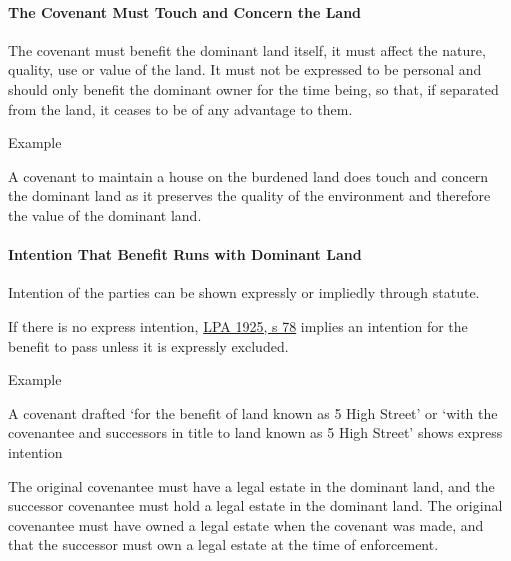 \documentclass[
]{article}
\newenvironment{env-de3101d4-f08b-48eb-bc0e-2fa06f3bcf8e}
{
    \savenotes\tcolorbox[blanker,breakable,left=5pt,borderline west={2pt}{-4pt}{purple}]
}
{
    \endtcolorbox\spewnotes
}
\begin{document}
\hypertarget{the-covenant-must-touch-and-concern-the-land}{%
\paragraph{The Covenant Must Touch and Concern the
Land}\label{the-covenant-must-touch-and-concern-the-land}}

The covenant must benefit the dominant land itself, it must affect the
nature, quality, use or value of the land. It must not be expressed to
be personal and should only benefit the dominant owner for the time
being, so that, if separated from the land, it ceases to be of any
advantage to them.

\begin{env-de3101d4-f08b-48eb-bc0e-2fa06f3bcf8e}

Example

A covenant to maintain a house on the burdened land does touch and
concern the dominant land as it preserves the quality of the environment
and therefore the value of the dominant land.

\end{env-de3101d4-f08b-48eb-bc0e-2fa06f3bcf8e}

\hypertarget{intention-that-benefit-runs-with-dominant-land}{%
\paragraph{Intention That Benefit Runs with Dominant
Land}\label{intention-that-benefit-runs-with-dominant-land}}

Intention of the parties can be shown expressly or impliedly through
statute.

If there is no express intention,
\href{https://www.legislation.gov.uk/ukpga/Geo5/15-16/20/section/78}{LPA
1925, s 78} implies an intention for the benefit to pass unless it is
expressly excluded.

\begin{env-de3101d4-f08b-48eb-bc0e-2fa06f3bcf8e}

Example

A covenant drafted `for the benefit of land known as 5 High Street' or
`with the covenantee and successors in title to land known as 5 High
Street' shows express intention

\end{env-de3101d4-f08b-48eb-bc0e-2fa06f3bcf8e}

The original covenantee must have a legal estate in the dominant land,
and the successor covenantee must hold a legal estate in the dominant
land. The original covenantee must have owned a legal estate when the
covenant was made, and that the successor must own a legal estate at the
time of enforcement.
\end{document}

